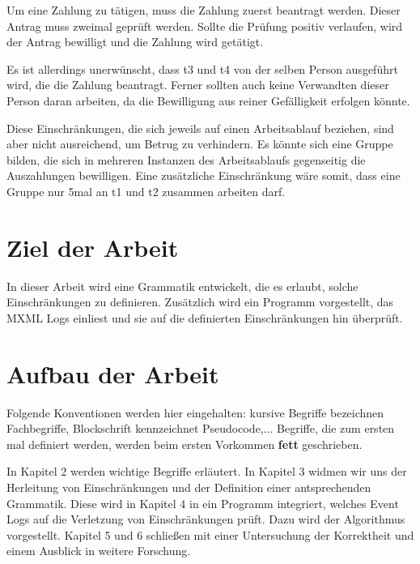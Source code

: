 Um eine Zahlung zu tätigen, muss die Zahlung zuerst beantragt werden. Dieser Antrag muss zweimal geprüft werden. Sollte die Prüfung positiv verlaufen, wird der Antrag bewilligt und die Zahlung wird getätigt.

Es ist allerdings unerwünscht, dass t3 und t4 von der selben Person ausgeführt wird, die die Zahlung beantragt. Ferner sollten auch keine Verwandten dieser Person daran arbeiten, da die Bewilligung aus reiner Gefälligkeit erfolgen könnte.

Diese Einschränkungen, die sich jeweils auf einen Arbeitsablauf beziehen, sind aber nicht ausreichend, um Betrug zu verhindern. 
Es könnte sich eine Gruppe bilden, die sich in mehreren Instanzen des Arbeitsablaufs gegenseitig die Auszahlungen bewilligen.
Eine zusätzliche Einschränkung wäre somit, dass eine Gruppe nur 5mal an t1 und t2 zusammen arbeiten darf.






\section{Ziel der Arbeit}

In dieser Arbeit wird eine Grammatik entwickelt, die es erlaubt, solche Einschränkungen zu definieren. Zusätzlich wird ein Programm vorgestellt, das MXML Logs einliest und sie auf die definierten Einschränkungen hin überprüft.




\section{Aufbau der Arbeit}
Folgende Konventionen werden hier eingehalten: kursive Begriffe  bezeichnen Fachbegriffe, Blockschrift kennzeichnet Pseudocode,...
Begriffe, die zum ersten mal definiert werden, werden beim ersten Vorkommen \textbf{fett} geschrieben.

In Kapitel 2 werden wichtige Begriffe erläutert. In Kapitel 3 widmen wir uns der  Herleitung von Einschränkungen und der Definition einer antsprechenden Grammatik. Diese wird in Kapitel 4 in ein Programm integriert, welches Event Logs auf die Verletzung von Einschränkungen prüft. Dazu wird der Algorithmus vorgestellt. Kapitel 5 und 6 schließen mit einer Untersuchung der Korrektheit und einem Ausblick in weitere Forschung.

